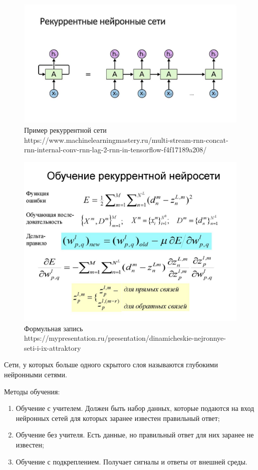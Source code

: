 \documentclass[12pt,a4paper]{report}
\begin{document}
\begin{enumerate}
\begin{figure}
	\centering
	\includegraphics[width=\columnwidth]{rek}
	\caption{Пример рекуррентной сети
	https://www.machinelearningmastery.ru/multi-stream-rnn-concat-rnn-internal-conv-rnn-lag-2-rnn-in-tensorflow-f4f17189a208/}
\end{figure}
\begin{figure}
	\centering
	\includegraphics[width=\columnwidth]{rek2}
	\caption{Формульная запись
	https://mypresentation.ru/presentation/dinamicheskie-nejronnye-seti-i-ix-attraktory}
\end{figure}

\end{enumerate}

Сети, у которых больше одного скрытого слоя называются глубокими нейронными сетями. 

Методы обучения:
\begin{enumerate}
	\item Обучение с учителем. Должен быть набор данных, которые подаются на вход нейронных сетей для которых заранее известен правильный ответ;
	\item Обучение без учителя. Есть данные, но правильный ответ для них заранее не известен;
	\item Обучение с подкреплением. Получает сигналы и ответы от внешней среды.
\end{enumerate}
\end{document}
